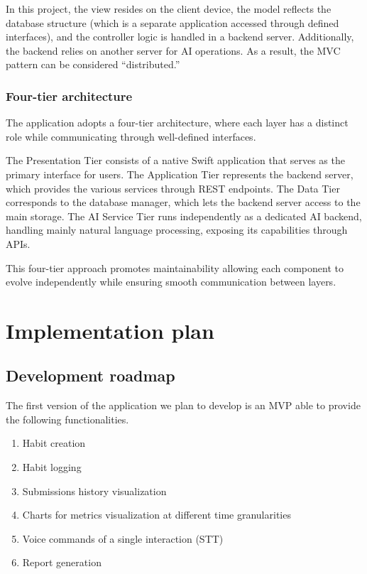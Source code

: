\documentclass{article}
\begin{document}
In this project, the view resides on the client device, the model reflects the database structure (which is a separate application accessed through defined interfaces), and the controller logic is handled in a backend server.
Additionally, the backend relies on another server for AI operations.
As a result, the MVC pattern can be considered “distributed.”

\subsubsection{Four-tier architecture}

The application adopts a four-tier architecture, where each layer has a distinct role while communicating through well-defined interfaces.

The Presentation Tier consists of a native Swift application that serves as the primary interface for users.
The Application Tier represents the backend server, which provides the various services through REST endpoints.
The Data Tier corresponds to the database manager, which lets the backend server access to the main storage.
The AI Service Tier runs independently as a dedicated AI backend, handling mainly natural language processing, exposing its capabilities through APIs.

This four-tier approach promotes maintainability allowing each component to evolve independently while ensuring smooth communication between layers.

\newpage
\section{Implementation plan}

\subsection{Development roadmap}

The first version of the application we plan to develop is an MVP able to provide the following functionalities.

\begin{enumerate}
    \item Habit creation
    \item Habit logging
    \item Submissions history visualization
    \item Charts for metrics visualization at different time granularities
    \item Voice commands of a single interaction (STT)
    \item Report generation
\end{enumerate}
\end{document}
